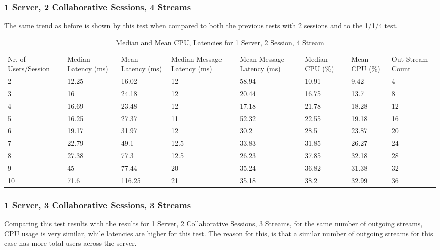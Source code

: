 \subsubsection{1 Server, 2 Collaborative Sessions, 4 Streams}
\label{sec:1serv_2sess_4str}

The same trend as before is shown by this test when compared to both the previous tests with 2 sessions and to the 1/1/4 test.

\begin{table}
\caption{Median and Mean CPU, Latencies for 1 Server, 2 Session, 4 Stream}
\label{table:1serv_2sess_4str}
\begin{tabu} to\linewidth{|X[c]|X[c]|X[c]|X[c]|X[c]|X[c]|X[c]|X[c]|}
\everyrow{\hline}
\hline
Nr. of Users/Session & Median Latency (ms) & Mean Latency (ms) & Median Message Latency (ms) & Mean Message Latency (ms) & Median CPU (\%) & Mean CPU (\%) & Out Stream Count\\
2 & 12.25 & 16.02 & 12 & 58.94 & 10.91 & 9.42 & 4 \\
3 & 16 & 24.18 & 12 & 20.44 & 16.75 & 13.7 & 8 \\
4 & 16.69 & 23.48 & 12 & 17.18 & 21.78 & 18.28 & 12 \\
5 & 16.25 & 27.37 & 11 & 52.32 & 22.55 & 19.18 & 16 \\
6 & 19.17 & 31.97 & 12 & 30.2 & 28.5 & 23.87 & 20 \\
7 & 22.79 & 49.1 & 12.5 & 33.83 & 31.85 & 26.27 & 24 \\
8 & 27.38 & 77.3 & 12.5 & 26.23 & 37.85 & 32.18 & 28 \\
9 & 45 & 77.44 & 20 & 35.24 & 36.82 & 31.38 & 32 \\
10 & 71.6 & 116.25 & 21 & 35.18 & 38.2 & 32.99 & 36 \\
\end{tabu}
\end{table}

\subsubsection{1 Server, 3 Collaborative Sessions, 3 Streams}
\label{sec:1serv_3sess_3str}

Comparing this test results with the results for 1 Server, 2 Collaborative Sessions, 3 Streams, for the same number of outgoing streams, CPU usage is very similar, while latencies are higher for this test. The reason for this, is that a similar number of outgoing streams for this case has more total users across the server.

